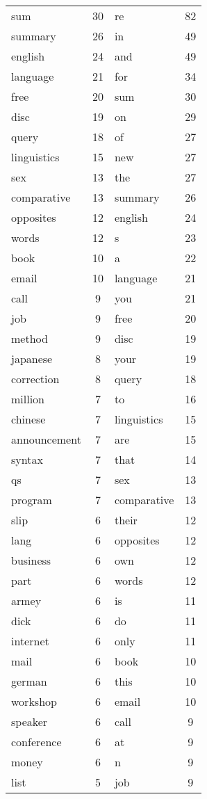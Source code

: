 \documentclass[10pt, a4paper]{article}
\begin{document}
\begin{longtable}{l c l c}
sum & 30 & re & 82 \\
summary & 26 & in & 49 \\
english & 24 & and & 49 \\
language & 21 & for & 34 \\
free & 20 & sum & 30 \\
disc & 19 & on & 29 \\
query & 18 & of & 27 \\
linguistics & 15 & new & 27 \\
sex & 13 & the & 27 \\
comparative & 13 & summary & 26 \\
opposites & 12 & english & 24 \\
words & 12 & s & 23 \\
book & 10 & a & 22 \\
email & 10 & language & 21 \\
call & 9 & you & 21 \\
job & 9 & free & 20 \\
method & 9 & disc & 19 \\
japanese & 8 & your & 19 \\
correction & 8 & query & 18 \\
million & 7 & to & 16 \\
chinese & 7 & linguistics & 15 \\
announcement & 7 & are & 15 \\
syntax & 7 & that & 14 \\
qs & 7 & sex & 13 \\
program & 7 & comparative & 13 \\
slip & 6 & their & 12 \\
lang & 6 & opposites & 12 \\
business & 6 & own & 12 \\
part & 6 & words & 12 \\
armey & 6 & is & 11 \\
dick & 6 & do & 11 \\
internet & 6 & only & 11 \\
mail & 6 & book & 10 \\
german & 6 & this & 10 \\
workshop & 6 & email & 10 \\
speaker & 6 & call & 9 \\
conference & 6 & at & 9 \\
money & 6 & n & 9 \\
list & 5 & job & 9 \\

\end{longtable}
\end{document}
